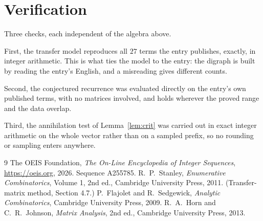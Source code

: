 \documentclass[11pt,a4paper]{article}
\theoremstyle{plain}
\theoremstyle{definition}
\begin{document}
\section{Verification}

Three checks, each independent of the algebra above.

First, the transfer model reproduces all $27$ terms the entry publishes, exactly, in
integer arithmetic. This is what ties the model to the entry: the digraph is built by reading
the entry's English, and a misreading gives different counts.

Second, the conjectured recurrence was evaluated directly on the entry's own published terms,
with no matrices involved, and holds wherever the proved range and the data overlap.

Third, the annihilation test of Lemma~\ref{lem:crit} was carried out in exact integer
arithmetic on the whole vector rather than on a sampled prefix, so no rounding or sampling
enters anywhere.

\begin{thebibliography}{9}
 The OEIS Foundation, \emph{The On-Line Encyclopedia of Integer
Sequences}, \url{https://oeis.org}, 2026. Sequence A255785.
 R.~P.~Stanley, \emph{Enumerative Combinatorics}, Volume 1, 2nd ed.,
Cambridge University Press, 2011. (Transfer-matrix method, Section 4.7.)
 P.~Flajolet and R.~Sedgewick, \emph{Analytic Combinatorics}, Cambridge
University Press, 2009.
 R.~A.~Horn and C.~R.~Johnson, \emph{Matrix Analysis}, 2nd ed., Cambridge
University Press, 2013.
\end{thebibliography}
\end{document}
